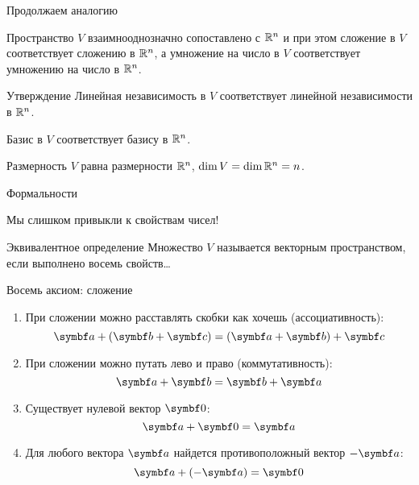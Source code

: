 \begin{frame}{Продолжаем аналогию}



Пространство $V$ взаимнооднозначно сопоставлено с $\mathbb{R}^n$ и при этом сложение в $V$ 
соответствует сложению в $\mathbb{R}^n$, 
а умножение на число в $V$ соответствует умножению на число в $\mathbb{R}^n$.
 


\begin{block}{Утверждение}
Линейная независимость в $V$ соответствует линейной независимости в $\mathbb{R}^n$.

Базис в $V$ соответствует базису в $\mathbb{R}^n$.

Размерность $V$ равна размерности $\mathbb{R}^n$, $\dim V = \dim \mathbb{R}^n = n$. 
\end{block}


\end{frame}



\begin{frame}{Формальности}

Мы слишком привыкли к свойствам чисел!

\pause

\vspace{40pt}

\begin{block}{Эквивалентное определение}
Множество $V$ называется \alert{векторным пространством}, если выполнено восемь свойств\ldots
\end{block}

\end{frame}

\begin{frame}{Восемь аксиом: сложение}
\begin{enumerate}
    \item При сложении можно расставлять скобки как хочешь (\alert{ассоциативность}):
    \[
    \ba + (\bb + \bc) = (\ba + \bb) + \bc    
    \]
    \item При сложении можно путать лево и право (\alert{коммутативность}):
    \[
    \ba + \bb = \bb + \ba    
    \]
    \item  Существует \alert{нулевой} вектор $\bzero$:
    \[
    \ba + \bzero = \ba    
    \]
    \item Для любого вектора $\ba$ найдется \alert{противоположный} вектор $-\ba$:
    \[
    \ba + (-\ba) = \bzero    
    \]
\end{enumerate}

\end{frame}


